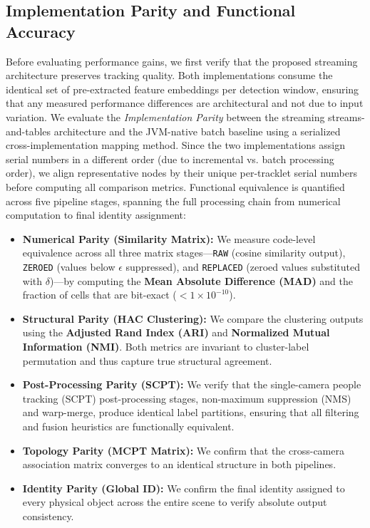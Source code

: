 \documentclass[5p,times]{elsarticle}
\begin{document}
\subsection{Implementation Parity and Functional Accuracy}
\label{sec:eval:parity}
Before evaluating performance gains, we first verify that the proposed streaming architecture preserves tracking quality. Both implementations consume the identical set of pre-extracted feature embeddings per detection window, ensuring that any measured performance differences are architectural and not due to input variation. We evaluate the \emph{Implementation Parity} between the streaming streams-and-tables architecture and the JVM-native batch baseline using a serialized cross-implementation mapping method. Since the two implementations assign serial numbers in a different order (due to incremental vs. batch processing order), we align representative nodes by their unique per-tracklet serial numbers before computing all comparison metrics. Functional equivalence is quantified across five pipeline stages, spanning the full processing chain from numerical computation to final identity assignment:

\begin{itemize}[leftmargin=*]
    \item \textbf{Numerical Parity (Similarity Matrix):} We measure code-level equivalence across all three matrix stages---\texttt{RAW} (cosine similarity output), \texttt{ZEROED} (values below $\epsilon$ suppressed), and \texttt{REPLACED} (zeroed values substituted with $\delta$)---by computing the \textbf{Mean Absolute Difference (MAD)} and the fraction of cells that are bit-exact ($< 1 \times 10^{-10}$).
    \item \textbf{Structural Parity (HAC Clustering):} We compare the clustering outputs using the \textbf{Adjusted Rand Index (ARI)} and \textbf{Normalized Mutual Information (NMI)}. Both metrics are invariant to cluster-label permutation and thus capture true structural agreement.
  
   \item \textbf{Post-Processing Parity (SCPT):} We verify that the single-camera people tracking (SCPT) post-processing stages, non-maximum suppression (NMS) and warp-merge, produce identical label partitions, ensuring that all filtering and fusion heuristics are functionally equivalent.
    \item \textbf{Topology Parity (MCPT Matrix):} We confirm that the cross-camera association matrix converges to an identical structure in both pipelines.
    \item \textbf{Identity Parity (Global ID):} We confirm the final identity assigned to every physical object across the entire scene to verify absolute output consistency.
\end{itemize}
\end{document}

